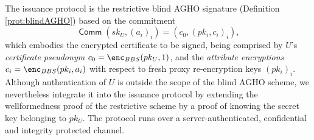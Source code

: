 \documentclass[runningheads]{llncs}
\DeclareMathOperator{\comm}{\mathsf{Comm}}
\begin{document}
The issuance protocol is the restrictive blind AGHO signature (Definition \ref{prot:blindAGHO}) based on the commitment 
\[
\comm(sk_U,(a_i)_i) = (c_0, (pk_i,c_i)_i), %
\]
which embodies the encrypted certificate to be signed, being comprised by  $U$'s \emph{certificate pseudonym} $c_0 =  \enc_{BBS}(pk_U, 1)$, and the \textit{attribute encryptions} $c_i  =\enc_{BBS}(pk_i, a_i)$ with respect to fresh proxy re-encryption keys $(pk_i)_i$.
Although authentication of $U$ is outside the scope of the blind AGHO scheme, %
we nevertheless integrate it into the issuance protocol by extending the wellformedness proof of the restrictive scheme by a proof of knowing the secret key belonging to $pk_U$.
The protocol runs over a server-authenticated, confidential and integrity protected channel.
\end{document}
